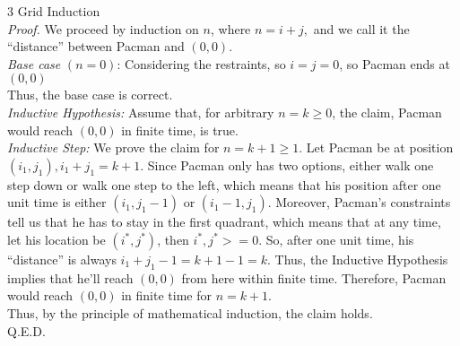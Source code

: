 \documentclass{article}
\begin{document}
{\Large 3 Grid Induction} \\[.5cm]
\textit{Proof.} We proceed by induction on $n$, where $n = i + j,$ and we call it the ``distance'' between Pacman and $(0,0).$ \\[.3cm]
\textit{Base case} $(n = 0)$: Considering the restraints, so $i = j = 0$, so Pacman ends at $(0,0)$ \\
Thus, the base case is correct.\\[.3cm]
\textit{Inductive Hypothesis:} Assume that, for arbitrary $n = k \geq 0$, the claim, Pacman would reach $(0,0)$ in finite time, is true.\\[.3cm]
\textit{Inductive Step:} We prove the claim for $n = k + 1\geq 1.$ Let Pacman be at position $(i_1, j_1), i_1 + j_1 = k + 1.$ Since Pacman only has two options, either walk one step down or walk one step to the left, which means that his position after one unit time is either $(i_1, j_1 - 1)$ or $(i_1 - 1, j_1)$. Moreover, Pacman's constraints tell us that he has to stay in the first quadrant, which means that at any time, let his location be $(i^*, j^*)$, then $i^*, j^* >= 0$. So, after one unit time, his ``distance'' is always $i_1 + j_1 - 1 = k + 1 - 1 = k$. Thus, the Inductive Hypothesis implies that he'll reach $(0,0)$ from here within finite time. Therefore, Pacman would reach $(0,0)$ in finite time for $n = k + 1$.\\[.3cm]
Thus, by the principle of mathematical induction, the claim holds.\\[.3cm]
Q.E.D.
\end{document}
